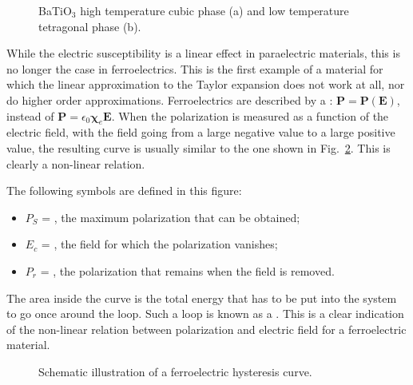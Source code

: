 \begin{figure}[t]
\centering\leavevmode
\caption{BaTiO$_3$ high temperature cubic phase (a) and low temperature tetragonal phase (b).}
\label{\chabbr:fig:batio3}
\end{figure}

While the electric susceptibility is a linear effect in paraelectric materials, this is no longer the case in ferroelectrics.  This is the first example of a material for which the linear approximation to the Taylor expansion does not work at all, nor do higher order approximations.  Ferroelectrics are described by a : $\mathbf{P} = \mathbf{P}(\mathbf{E})$, instead of $\mathbf{P}=\epsilon_0\bm{\chi}_e\mathbf{E}$.  When the polarization is measured as a function of the electric field, with the field going from a large negative value to a large positive value, the resulting curve is usually similar to the one shown in Fig.~\ref{\chabbr:fig:ferroelectric}.  This is clearly a non-linear relation.

The following symbols are defined in this figure:
\begin{itemize}
	\item $P_S$ = , the maximum polarization that can be obtained;
	
	\item $E_c$ = , the field for which the polarization vanishes;
	
	\item $P_r$ = , the polarization that remains when the field is removed.
\end{itemize}
The area inside the curve is the total energy that has to be put into the system to go once around the loop. Such a loop is known as a .  This is a clear indication of the non-linear relation between polarization and electric field for a ferroelectric material.

\begin{figure}[h]
\centering\leavevmode
\caption{Schematic illustration of a ferroelectric hysteresis curve.}
\label{\chabbr:fig:ferroelectric}
\end{figure}

